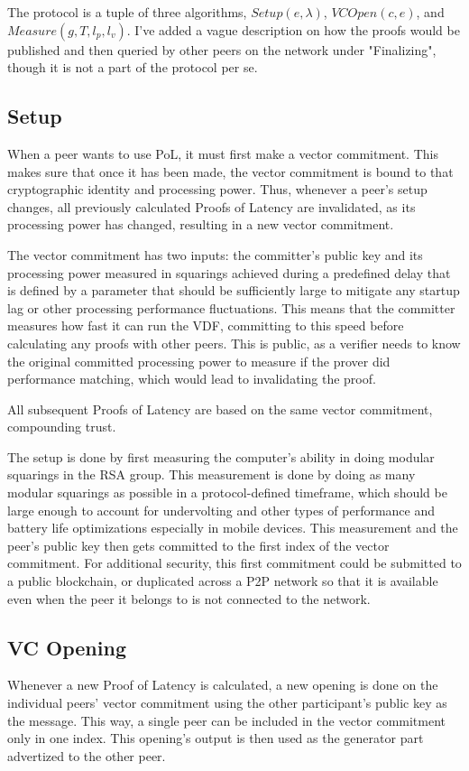 The protocol is a tuple of three algorithms, \(Setup(e, \lambda)\), \(VCOpen(c, e)\), and \(Measure(g, T, l_p, l_v)\). I've added a vague description on how the proofs would be published and then queried by other peers on the network under "Finalizing", though it is not a part of the protocol per se.

\subsection{Setup}
When a peer wants to use PoL, it must first make a vector commitment. This makes sure that once it has been made, the vector commitment is bound to that cryptographic identity and processing power. Thus, whenever a peer's setup changes, all previously calculated Proofs of Latency are invalidated, as its processing power has changed, resulting in a new vector commitment.

The vector commitment has two inputs: the committer's public key and its processing power measured in squarings achieved during a predefined delay that is defined by a parameter that should be sufficiently large to mitigate any startup lag or other processing performance fluctuations. This means that the committer measures how fast it can run the VDF, committing to this speed before calculating any proofs with other peers. This is public, as a verifier needs to know the original committed processing power to measure if the prover did performance matching, which would lead to invalidating the proof.

All subsequent Proofs of Latency are based on the same vector commitment, compounding trust.

The setup is done by first measuring the computer's ability in doing modular squarings in the RSA group. This measurement is done by doing as many modular squarings as possible in a protocol-defined timeframe, which should be large enough to account for undervolting and other types of performance and battery life optimizations especially in mobile devices. This measurement and the peer's public key then gets committed to the first index of the vector commitment. For additional security, this first commitment could be submitted to a public blockchain, or duplicated across a P2P network so that it is available even when the peer it belongs to is not connected to the network.

\subsection{VC Opening}
Whenever a new Proof of Latency is calculated, a new opening is done on the individual peers' vector commitment using the other participant's public key as the message. This way, a single peer can be included in the vector commitment only in one index. This opening's output is then used as the generator part advertized to the other peer.

